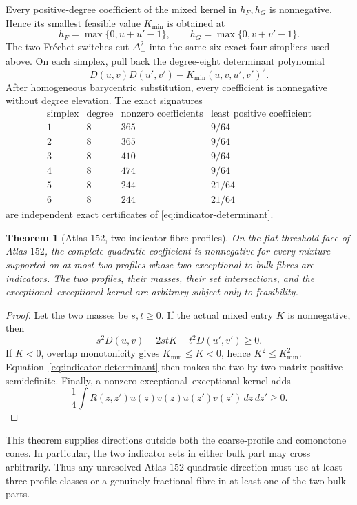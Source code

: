 \documentclass[11pt]{article}
\newtheorem{theorem}{Theorem}[section]
\begin{document}
Every positive-degree coefficient of the mixed kernel in $h_F,h_G$ is
nonnegative.  Hence its smallest feasible value $K_{\min}$ is obtained at
\[
 h_F=\max\{0,u+u'-1\},\qquad
 h_G=\max\{0,v+v'-1\}.
\]
The two Fr\'echet switches cut $\Delta_+^2$ into the same six exact
four-simplices used above.  On each simplex, pull back the degree-eight
determinant polynomial
\begin{equation}
 D(u,v)D(u',v')-K_{\min}(u,v,u',v')^2.
 \label{eq:indicator-determinant}
\end{equation}
After homogeneous barycentric substitution, every coefficient is
nonnegative without degree elevation.  The exact signatures
\[
\begin{array}{c|ccc}
\text{simplex}&\text{degree}&\text{nonzero coefficients}&
 \text{least positive coefficient}\\ \hline
1&8&365&9/64\\
2&8&365&9/64\\
3&8&410&9/64\\
4&8&474&9/64\\
5&8&244&21/64\\
6&8&244&21/64
\end{array}
\]
are independent exact certificates of \eqref{eq:indicator-determinant}.

\begin{theorem}[Atlas 152, two indicator-fibre profiles]
\label{thm:atlas152-two-indicator}
On the flat threshold face of Atlas $152$, the complete quadratic
coefficient is nonnegative for every mixture supported on at most two
profiles whose two exceptional-to-bulk fibres are indicators.  The two
profiles, their masses, their set intersections, and the
exceptional--exceptional kernel are arbitrary subject only to feasibility.
\end{theorem}

\begin{proof}
Let the two masses be $s,t\geq0$.  If the actual mixed entry $K$ is
nonnegative, then
\[
 s^2D(u,v)+2stK+t^2D(u',v')\geq0.
\]
If $K<0$, overlap monotonicity gives
$K_{\min}\leq K<0$, hence $K^2\leq K_{\min}^2$.
Equation~\eqref{eq:indicator-determinant} then makes the two-by-two matrix
positive semidefinite.  Finally, a nonzero exceptional--exceptional kernel
adds
\[
 \frac14\int R(z,z')u(z)v(z)u(z')v(z')\,dz\,dz'\geq0.
\]
\end{proof}

This theorem supplies directions outside both the coarse-profile and
comonotone cones.  In particular, the two indicator sets in either bulk part
may cross arbitrarily.  Thus any unresolved Atlas $152$ quadratic direction
must use at least three profile classes or a genuinely fractional fibre in
at least one of the two bulk parts.
\end{document}
